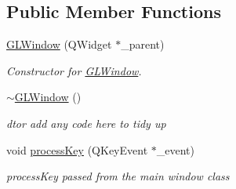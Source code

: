 \subsection*{Public Member Functions}
\begin{DoxyCompactItemize}
\item 
\hyperlink{classGLWindow_a8dfc33113be0a86a53ddbea054f75292}{GLWindow} (QWidget $\ast$\_\-parent)
\begin{DoxyCompactList}\small\item\em Constructor for \hyperlink{classGLWindow}{GLWindow}. \end{DoxyCompactList}\item 
\hypertarget{classGLWindow_a2eeaea2148f4f72344edd6d1bac9759b}{
\hyperlink{classGLWindow_a2eeaea2148f4f72344edd6d1bac9759b}{$\sim$GLWindow} ()}
\label{classGLWindow_a2eeaea2148f4f72344edd6d1bac9759b}

\begin{DoxyCompactList}\small\item\em dtor add any code here to tidy up \end{DoxyCompactList}\item 
void \hyperlink{classGLWindow_a72623f17bba6e8b6448efb0572bbdd00}{processKey} (QKeyEvent $\ast$\_\-event)
\begin{DoxyCompactList}\small\item\em processKey passed from the main window class \end{DoxyCompactList}\end{DoxyCompactItemize}
